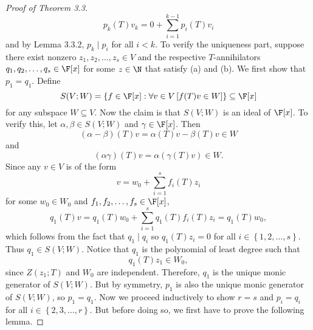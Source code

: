 \documentclass[math_245.tex]{subfiles}
\begin{document}
\begin{proof}[Proof of Theorem 3.3]
        \begin{equation*}
            p_k(T)v_k = 0 + \sum^{k-1}_{i=1} p_i(T)v_i
        \end{equation*}
        and by Lemma 3.3.2, $p_k\mid p_i$ for all $i<k$. To verify the uniqueness part, suppose there exist nonzero $z_1,z_2,\ldots,z_s\in V$ and the respective $T$-annihilators $q_1,q_2,\ldots,q_s\in\F[x]$ for some $z\in\N$ that satisfy (a) and (b). We first show that $p_1=q_1$. Define
        \begin{equation*}
            S(V;W) = \left\lbrace f\in\F[x]:\forall v\in V \left[ f(T)v\in W \right] \right\rbrace \subseteq \F[x] 
        \end{equation*}
        for any subspace $W\subseteq V$. Now the claim is that $S(V;W)$ is an ideal of $\F[x]$. To verify this, let $\alpha,\beta\in S(V;W)$ and $\gamma\in\F[x]$. Then
        \begin{equation*}
            \left( \alpha-\beta \right) (T)v = \alpha(T)v - \beta(T)v\in W
        \end{equation*}
        and
        \begin{equation*}
            \left( \alpha\gamma \right) (T)v = \alpha\left( \gamma(T)v \right) \in W.
        \end{equation*}
        Since any $v\in V$ is of the form
        \begin{equation*}
            v = w_0 + \sum^{s}_{i=1} f_i(T)z_i
        \end{equation*}
        for some $w_0\in W_0$ and $f_1,f_2,\ldots,f_s\in\F[x]$,
        \begin{equation*}
            q_1(T)v = q_1(T)w_0 + \sum^{s}_{i=1} q_1(T)f_i(T)z_i = q_1(T)w_0,
        \end{equation*}
        which follows from the fact that $q_1\mid q_i$ so $q_1(T)z_i = 0$ for all $i\in \left\lbrace 1,2,\ldots,s \right\rbrace$. Thus $q_1\in S\left( V;W \right)$. Notice that $q_1$ is the polynomial of least degree such that
        \begin{equation*}
            q_1(T)z_1\in W_0,
        \end{equation*}
        since $Z\left( z_1;T \right)$ and $W_0$ are independent. Therefore, $q_1$ is the unique monic generator of $S\left( V;W \right)$. But by symmetry, $p_1$ is also the unique monic generator of $S\left( V;W \right) $, so $p_1=q_1$. Now we proceed inductively to show $r=s$ and $p_i=q_i$ for all $i\in\left\lbrace 2,3,\ldots,r \right\rbrace $. But before doing so, we first have to prove the following lemma. \suppressqedsym
    \end{proof}
\end{document}
